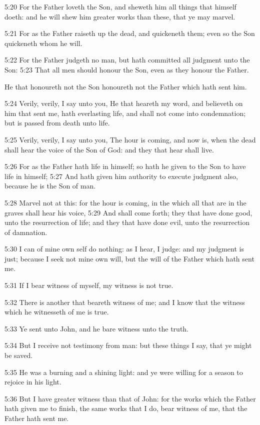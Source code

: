 5:20 For the Father loveth the Son, and sheweth him all things that
himself doeth: and he will shew him greater works than these, that ye
may marvel.

5:21 For as the Father raiseth up the dead, and quickeneth them; even
so the Son quickeneth whom he will.

5:22 For the Father judgeth no man, but hath committed all judgment
unto the Son: 5:23 That all men should honour the Son, even as they
honour the Father.

He that honoureth not the Son honoureth not the Father which hath sent
him.

5:24 Verily, verily, I say unto you, He that heareth my word, and
believeth on him that sent me, hath everlasting life, and shall not
come into condemnation; but is passed from death unto life.

5:25 Verily, verily, I say unto you, The hour is coming, and now is,
when the dead shall hear the voice of the Son of God: and they that
hear shall live.

5:26 For as the Father hath life in himself; so hath he given to the
Son to have life in himself; 5:27 And hath given him authority to
execute judgment also, because he is the Son of man.

5:28 Marvel not at this: for the hour is coming, in the which all that
are in the graves shall hear his voice, 5:29 And shall come forth;
they that have done good, unto the resurrection of life; and they that
have done evil, unto the resurrection of damnation.

5:30 I can of mine own self do nothing: as I hear, I judge: and my
judgment is just; because I seek not mine own will, but the will of
the Father which hath sent me.

5:31 If I bear witness of myself, my witness is not true.

5:32 There is another that beareth witness of me; and I know that the
witness which he witnesseth of me is true.

5:33 Ye sent unto John, and he bare witness unto the truth.

5:34 But I receive not testimony from man: but these things I say,
that ye might be saved.

5:35 He was a burning and a shining light: and ye were willing for a
season to rejoice in his light.

5:36 But I have greater witness than that of John: for the works which
the Father hath given me to finish, the same works that I do, bear
witness of me, that the Father hath sent me.

